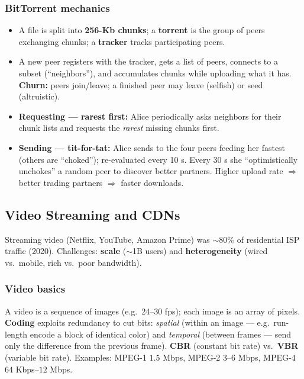 \documentclass[hidelinks]{article}
\begin{document}
\subsubsection{BitTorrent mechanics}
\begin{itemize}
    \item A file is split into \textbf{256-Kb chunks}; a \textbf{torrent} is
    the group of peers exchanging chunks; a \textbf{tracker} tracks
    participating peers.
    \item A new peer registers with the tracker, gets a list of peers,
    connects to a subset (``neighbors''), and accumulates chunks while
    uploading what it has. \textbf{Churn:} peers join/leave; a finished peer
    may leave (selfish) or seed (altruistic).
    \item \textbf{Requesting --- rarest first:} Alice periodically asks
    neighbors for their chunk lists and requests the \emph{rarest} missing
    chunks first.
    \item \textbf{Sending --- tit-for-tat:} Alice sends to the four peers
    feeding her fastest (others are ``choked''); re-evaluated every 10 s.
    Every 30 s she ``optimistically unchokes'' a random peer to discover
    better partners. Higher upload rate $\Rightarrow$ better trading
    partners $\Rightarrow$ faster downloads.
\end{itemize}

\subsection{Video Streaming and CDNs}

Streaming video (Netflix, YouTube, Amazon Prime) was $\sim$80\% of
residential ISP traffic (2020). Challenges: \textbf{scale} ($\sim$1B users)
and \textbf{heterogeneity} (wired vs.\ mobile, rich vs.\ poor bandwidth).

\subsubsection{Video basics}
A video is a sequence of images (e.g.\ 24--30 fps); each image is an array of
pixels. \textbf{Coding} exploits redundancy to cut bits: \emph{spatial}
(within an image --- e.g.\ run-length encode a block of identical color) and
\emph{temporal} (between frames --- send only the difference from the
previous frame). \textbf{CBR} (constant bit rate) vs.\ \textbf{VBR} (variable
bit rate). Examples: MPEG-1 $1.5$ Mbps, MPEG-2 $3$--$6$ Mbps, MPEG-4
$64$ Kbps--$12$ Mbps.
\end{document}
